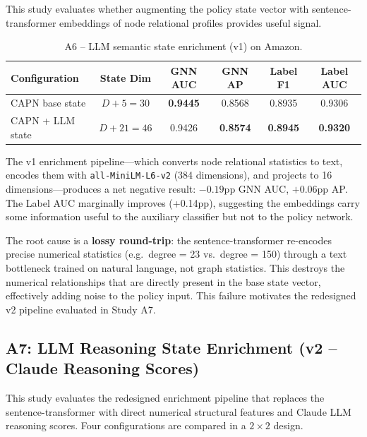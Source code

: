 This study evaluates whether augmenting the policy state vector with sentence-transformer embeddings of node relational profiles provides useful signal.

\begin{table}[h!]
\centering
\begin{tabular}{lccccc}
\toprule
\textbf{Configuration} & \textbf{State Dim} & \textbf{GNN AUC} & \textbf{GNN AP} & \textbf{Label F1} & \textbf{Label AUC} \\
\midrule
CAPN base state    & $D + 5 = 30$ & \textbf{0.9445} & 0.8568 & 0.8935 & 0.9306 \\
CAPN + LLM state   & $D + 21 = 46$ & 0.9426 & \textbf{0.8574} & \textbf{0.8945} & \textbf{0.9320} \\
\bottomrule
\end{tabular}
\caption{A6 -- LLM semantic state enrichment (v1) on Amazon.}
\label{tab:a6-llm-state}
\end{table}

\noindent
The v1 enrichment pipeline---which converts node relational statistics to text, encodes them with \texttt{all-MiniLM-L6-v2} (384 dimensions), and projects to 16 dimensions---produces a net negative result: $-0.19$pp GNN AUC, $+0.06$pp AP. The Label AUC marginally improves (+0.14pp), suggesting the embeddings carry some information useful to the auxiliary classifier but not to the policy network.

The root cause is a \textbf{lossy round-trip}: the sentence-transformer re-encodes precise numerical statistics (e.g.\ degree = 23 vs.\ degree = 150) through a text bottleneck trained on natural language, not graph statistics. This destroys the numerical relationships that are directly present in the base state vector, effectively adding noise to the policy input. This failure motivates the redesigned v2 pipeline evaluated in Study A7.

\subsection{A7: LLM Reasoning State Enrichment (v2 -- Claude Reasoning Scores)}

This study evaluates the redesigned enrichment pipeline that replaces the sentence-transformer with direct numerical structural features and Claude LLM reasoning scores. Four configurations are compared in a $2 \times 2$ design.

